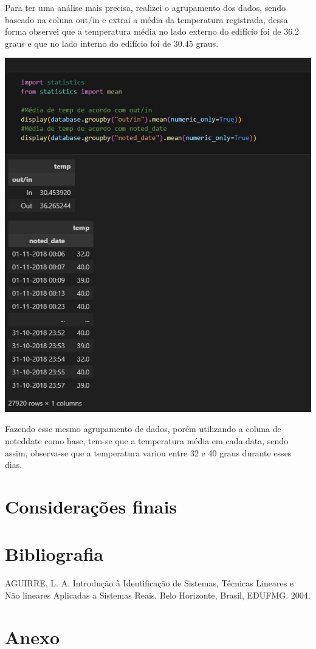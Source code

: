 \documentclass[a4paper, 12pt]{article}
\begin{document}
Para ter uma análise mais precisa, realizei o agrupamento dos dados, sendo baseado na coluna out/in e extrai a média da temperatura registrada, dessa forma observei que a temperatura média no lado externo do edifício foi de 36.2 graus e que no lado interno do edifício foi de 30.45 graus.

\includegraphics[scale=0.6]{img 07.jpg}

Fazendo esse mesmo agrupamento de dados, porém utilizando a coluna de noteddate como base, tem-se que a temperatura média em cada data, sendo assim, observa-se que a temperatura variou entre 32 e 40 graus durante esses dias.



\newpage
\section{Considerações finais}
\newpage

\section*{Bibliografia}
\footnotesize{

\noindent AGUIRRE, L. A. Introdução à Identificação de Sistemas, Técnicas Lineares e Não lineares Aplicadas a Sistemas Reais. Belo Horizonte, Brasil, EDUFMG. 2004.\\

}
\newpage
{}
\section*{Anexo}
\end{document}
